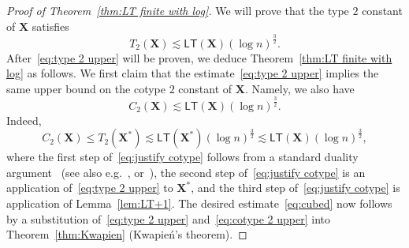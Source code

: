 \documentclass[11pt,reqno]{amsart}
\renewcommand{\le}{\leqslant}
\newcommand{\X}{\mathbf X}
\theoremstyle{remark}
\renewcommand{\1}{\mathbf 1}
\newcommand{\LT}{\mathsf{LT}}
\begin{document}
\begin{proof}[Proof of Theorem~\ref{thm:LT finite with log}] We will prove that the type $2$ constant of $\X$ satisfies
\begin{equation}\label{eq:type 2 upper}
T_2(\X)\lesssim \LT(\X)(\log n)^{\frac32}.
\end{equation}
After~\eqref{eq:type 2 upper} will be proven, we deduce Theorem~\ref{thm:LT finite with log} as follows. We first claim that the estimate~\eqref{eq:type 2 upper} implies the same upper bound on the cotype $2$ constant of $\X$. Namely, we also have
\begin{equation}\label{eq:cotype 2 upper}
C_2(\X)\lesssim \LT(\X)(\log n)^{\frac32}.
\end{equation}
Indeed,
\begin{equation}\label{eq:justify cotype}
C_2(\X)\le T_2(\X^*)\lesssim \LT(\X^*)(\log n)^{\frac32}\lesssim \LT(\X)(\log n)^{\frac32},
\end{equation}
where the first step of~\eqref{eq:justify cotype} follows from a standard duality argument~\cite{MP76} (see also e.g.~\cite[Section~9.10]{MS86}, \cite[Section~4.9]{PW98} or~\cite[Proposition~6.2.12]{AK06}), the second step of~\eqref{eq:justify cotype}  is an application of~\eqref{eq:type 2 upper} to $\X^*$, and the third step of~\eqref{eq:justify cotype}  is application of Lemma~\ref{lem:LT+1}. The desired estimate~\eqref{eq:cubed} now follows by a substitution of~\eqref{eq:type 2 upper}  and~\eqref{eq:cotype 2 upper} into Theorem~\ref{thm:Kwapien} (Kwapie\'n's theorem).



\end{proof}
\end{document}
